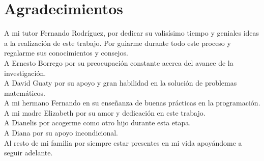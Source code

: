 \chapter*{Agradecimientos}\label{chapter:agradecimientos}

A mi tutor Fernando Rodríguez, por dedicar su valisísimo tiempo y geniales ideas a la realización de este trabajo. Por guiarme durante todo este proceso y regalarme sus conocimientos y consejos.
\\

A Ernesto Borrego por su preocupación constante acerca del avance de la investigación.
\\

A David Guaty por su apoyo y gran habilidad en la solución de problemas matemáticos.
\\

A mi hermano Fernando en su enseñanza de buenas prácticas en la programación.
\\

A mi madre Elizabeth por su amor y dedicación en este trabajo.
\\

A Dianelis por acogerme como otro hijo durante esta etapa.
\\

A Diana por su apoyo incondicional.
\\

Al resto de mi familia por siempre estar presentes en mi vida apoyándome a seguir adelante.
